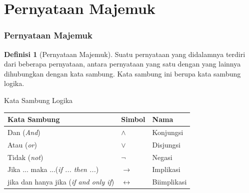 \documentclass[handout]{beamer}
\theoremstyle{definition}
\newtheorem{definisi}[theorem]{Definisi}
\theoremstyle{example}
\begin{document}
\section{Pernyataan Majemuk}
\begin{frame}
\frametitle{Pernyataan Majemuk}
  \begin{definisi}[Pernyataan Majemuk]
   Suatu pernyataan yang didalamnya terdiri dari beberapa pernyataan, antara pernyataan yang satu dengan yang lainnya dihubungkan dengan kata sambung. Kata sambung ini berupa kata sambung logika.
  \end{definisi}
  
  \begin{block}{Kata Sambung Logika}
  	\begin{tabular}{ | l | l | l | }
  		\hline
  		Kata Sambung & Simbol & Nama \\ \hline
  		Dan (\textit{And}) & $\wedge$ & Konjungsi \\ \hline
  		Atau (\textit{or}) & $\vee$ & Disjungsi \\ \hline
  		Tidak (\textit{not}) & $\neg$ & Negasi \\ \hline
  		Jika ... maka ...(\textit{if ... then ...}) & $\rightarrow$ & Implikasi \\ \hline
  		jika dan hanya jika (\textit{if and only if}) & $\leftrightarrow$ & Biimplikasi \\ 
  		\hline
  	\end{tabular}
  \end{block}
  
  
\end{frame}
\end{document}
